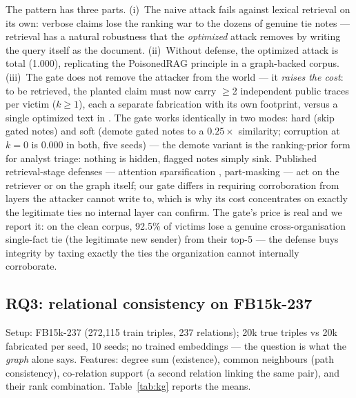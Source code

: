 \documentclass[conference]{IEEEtran}
\begin{document}
The pattern has three parts. (i)~The naive attack fails against lexical
retrieval on its own: verbose claims lose the ranking war to the dozens of
genuine tie notes --- retrieval has a natural robustness that the
\emph{optimized} attack removes by writing the query itself as the
document. (ii)~Without defense, the optimized attack is total (1.000),
replicating the PoisonedRAG principle in a graph-backed corpus. (iii)~The
gate does not remove the attacker from the world --- it \emph{raises the
cost}: to be retrieved, the planted claim must now carry $\ge$2 independent
public traces per victim ($k{\ge}1$), each a separate fabrication with its
own footprint, versus a single optimized text in
\cite{zou2024poisonedrag}. The gate works identically in two modes: hard
(skip gated notes) and soft (demote gated notes to a $0.25\times$
similarity; corruption at $k{=}0$ is 0.000 in both, five seeds) --- the
demote variant is the ranking-prior form for analyst triage: nothing is
hidden, flagged notes simply sink. Published retrieval-stage defenses --- attention
sparsification \cite{cheng2025securerag}, part-masking
\cite{pathmanathan2025ragpart} --- act on the retriever or on the graph
itself; our gate differs in requiring corroboration from layers the
attacker cannot write to, which is why its cost concentrates on exactly
the legitimate ties no internal layer can confirm. The gate's price is
real and we report it: on
the clean corpus, 92.5\% of victims lose a genuine cross-organisation
single-fact tie (the legitimate new sender) from their top-5 ---
the defense buys integrity by taxing exactly the ties the organization
cannot internally corroborate.

\subsection{RQ3: relational consistency on FB15k-237}
\label{sec:res-kg}

Setup: FB15k-237 \cite{toutanova2015fb15k} (272{,}115 train triples, 237
relations); 20k true triples vs 20k fabricated per seed, 10 seeds; no
trained embeddings --- the question is what the \emph{graph} alone says.
Features: degree sum (existence), common neighbours (path consistency),
co-relation support (a second relation linking the same pair), and their
rank combination. Table~\ref{tab:kg} reports the means.
\end{document}
